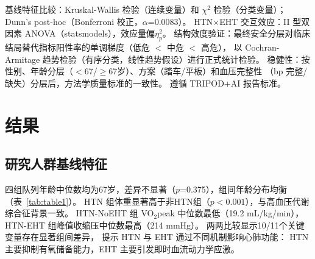 \documentclass[12pt, a4paper]{ctexart}
\begin{document}
基线特征比较：Kruskal-Wallis 检验（连续变量）和 $\chi^2$ 检验（分类变量）；
Dunn's post-hoc（Bonferroni 校正，$\alpha$=0.0083）。
HTN$\times$EHT 交互效应：II 型双因素 ANOVA（statsmodels），效应量偏$\eta^2_p$\cite{Cohen1988}。
结构效度验证：最终安全分层对临床结局替代指标阳性率的单调梯度（低危 $<$ 中危 $<$ 高危），
以 Cochran-Armitage 趋势检验（有序分类，线性趋势假设）进行正式统计检验。
稳健性：按性别、年龄分层（$<$67/$\geq$67岁）、方案（踏车/平板）和血压完整性
（bp 完整/缺失）分层后，方法学质量标准的一致性。
遵循 TRIPOD+AI\cite{TRIPODAI2024} 报告标准。

\section{结果}

\subsection{研究人群基线特征}

四组队列年龄中位数均为67岁，差异不显著（$p$=0.375），组间年龄分布均衡
（表~\ref{tab:table1}）。
HTN 组体重显著高于非HTN组（$p<0.001$），与高血压代谢综合征背景一致。
HTN-NoEHT 组 VO$_2$peak 中位数最低（19.2 mL/kg/min），
HTN-EHT 组峰值收缩压中位数最高（214 mmHg）。
两两比较显示10/11个关键变量存在显著组间差异，
提示 HTN 与 EHT 通过不同机制影响心肺功能：
HTN 主要抑制有氧储备能力，EHT 主要引发即时血流动力学应激。
\end{document}

